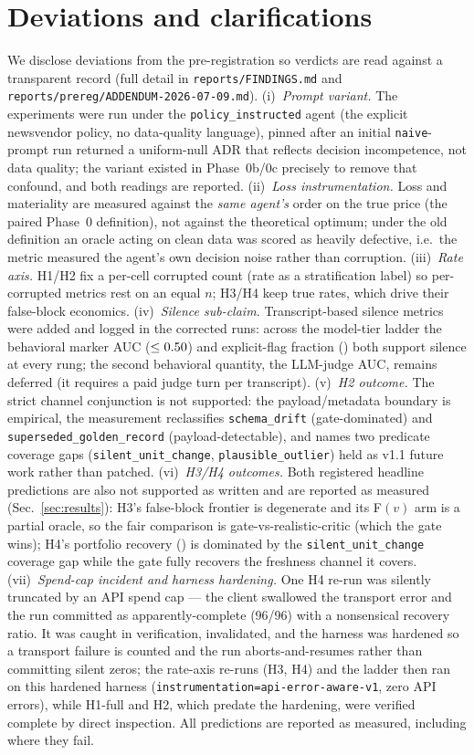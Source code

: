 \documentclass[11pt]{article}
\theoremstyle{plain}
\theoremstyle{definition}
\begin{document}
\section{Deviations and clarifications}\label{sec:deviations}
We disclose deviations from the pre-registration so verdicts are read against a
transparent record (full detail in \texttt{reports/FINDINGS.md} and
\texttt{reports/prereg/ADDENDUM-2026-07-09.md}). (i)~\emph{Prompt variant.} The
experiments were run under the \texttt{policy\_instructed} agent (the explicit
newsvendor policy, no data-quality language), pinned after an initial
\texttt{naive}-prompt run returned a uniform-null ADR that reflects decision
incompetence, not data quality; the variant existed in Phase~0b/0c precisely to remove
that confound, and both readings are reported. (ii)~\emph{Loss instrumentation.} Loss
and materiality are measured against the \emph{same agent's} order on the true price
(the paired Phase~0 definition), not against the theoretical optimum; under the old
definition an oracle acting on clean data was scored as heavily defective, i.e.\ the
metric measured the agent's own decision noise rather than corruption. (iii)~\emph{Rate axis.} H1/H2 fix a per-cell corrupted
count (rate as a stratification label) so per-corrupted metrics rest on an equal $n$;
H3/H4 keep true rates, which drive their false-block economics. (iv)~\emph{Silence
sub-claim.} Transcript-based silence metrics were added and logged in the corrected runs:
across the model-tier ladder the behavioral marker AUC ($\le 0.50$) and
explicit-flag fraction (\HoneLadderFlag) both support silence at every rung; the second
behavioral quantity, the LLM-judge AUC, remains deferred (it requires a paid judge turn per
transcript). (v)~\emph{H2 outcome.} The strict channel conjunction is not supported: the
payload/metadata boundary is empirical, the measurement reclassifies \texttt{schema\_drift}
(gate-dominated) and \texttt{superseded\_golden\_record} (payload-detectable), and names two
predicate coverage gaps (\texttt{silent\_unit\_change}, \texttt{plausible\_outlier}) held as
v1.1 future work rather than patched. (vi)~\emph{H3/H4 outcomes.} Both registered headline
predictions are also not supported as written and are reported as measured (Sec.~\ref{sec:results}):
H3's false-block frontier is degenerate and its F$(v)$ arm is a partial oracle, so the fair
comparison is gate-vs-realistic-critic (which the gate wins); H4's portfolio recovery
(\HfourRecovery) is dominated by the \texttt{silent\_unit\_change} coverage gap while the gate
fully recovers the freshness channel it covers. (vii)~\emph{Spend-cap incident and harness
hardening.} One H4 re-run was silently truncated by an API spend cap --- the client swallowed
the transport error and the run committed as apparently-complete (96/96) with a nonsensical
recovery ratio. It was caught in verification, invalidated, and the harness was hardened so a
transport failure is counted and the run aborts-and-resumes rather than committing silent
zeros; the rate-axis re-runs (H3, H4) and the ladder then ran on this hardened harness
(\texttt{instrumentation=api-error-aware-v1}, zero API errors), while H1-full and H2, which
predate the hardening, were verified complete by direct inspection. All predictions are
reported as measured, including where they fail.
\end{document}
